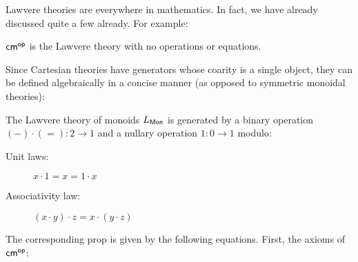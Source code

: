 %
%
%
%
Lawvere theories are everywhere in mathematics.  In fact, we have already discussed quite a few already.  For example:
\begin{example}
${\sf cm}^{\mathsf{op}}$ is the Lawvere theory with no operations or equations.
\end{example}
Since Cartesian theories have generators whose coarity is a single object, they can be defined algebraically in a concise manner (as opposed to symmetric monoidal theories):
\begin{example}
The Lawvere theory of monoids $L_{\sf Mon}$ is generated by a binary operation $(-)\cdot (=):2\to 1$ and a nullary operation $1:0\to 1$ modulo:
\begin{description}
\item[Unit laws:] $x\cdot 1 = x = 1\cdot x$
\item[Associativity law:] $(x\cdot y)\cdot z= x\cdot (y\cdot z)$
\end{description}
\end{example}
The corresponding prop is given by the following equations.  First, the axioms of ${\sf cm}^{\mathsf{op}}$:
